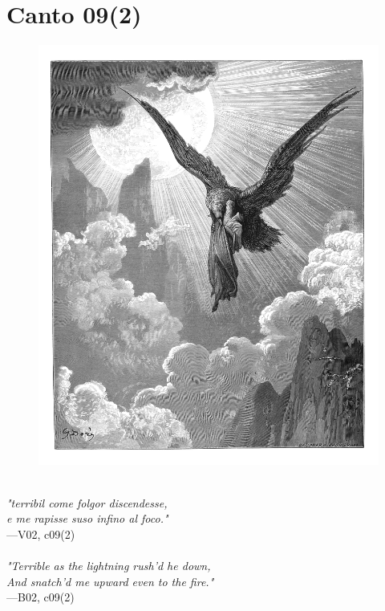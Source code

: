 \documentclass[../Dore_vision.tex]{subfiles}
\begin{document}
\newpage

\section{Canto 09(2)}

\begin{figure}[ht]
\centering
\includegraphics[height=\figsize]{illustrations/book_2/V02, c09(2).jpg}
\end{figure}

\begin{center}
\begin{minipage}{0.8\linewidth}
\textit{\\
"terribil come folgor discendesse,\\e me rapisse suso infino al foco."} \\
—V02, c09(2) \\~\\
\textit{"Terrible as the lightning rush'd he down,\\And snatch'd me upward even to the fire."} \\
—B02, c09(2)
\end{minipage}
\end{center}
\end{document}
